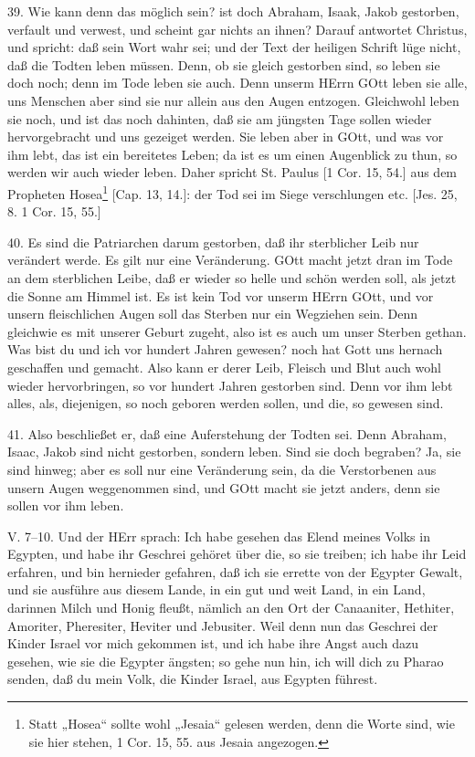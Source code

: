 39. Wie kann denn das möglich sein? ist doch Abraham, Isaak, Jakob gestorben, verfault und verwest, und scheint gar nichts an ihnen? Darauf antwortet Christus, und spricht: daß sein Wort wahr sei; und der Text der heiligen Schrift lüge nicht, daß die Todten leben müssen. Denn, ob sie gleich gestorben sind, so leben sie doch noch; denn im Tode leben sie auch. Denn unserm HErrn GOtt leben sie alle, uns Menschen aber sind sie nur allein aus den Augen entzogen. Gleichwohl leben sie noch, und ist das noch dahinten, daß sie am jüngsten Tage sollen wieder hervorgebracht und uns gezeiget werden. Sie leben aber in GOtt, und was vor ihm lebt, das ist ein bereitetes Leben; da ist es um einen Augenblick zu thun, so werden wir auch wieder leben. Daher spricht St. Paulus [1 Cor. 15, 54.] aus dem Propheten Hosea\footnote{Statt „Hosea“ sollte wohl „Jesaia“ gelesen werden, denn die Worte sind, wie sie hier stehen, 1 Cor. 15, 55. aus Jesaia angezogen.} [Cap. 13, 14.]: der Tod sei im Siege verschlungen etc. [Jes. 25, 8. 1 Cor. 15, 55.]

40. Es sind die Patriarchen darum gestorben,
daß ihr sterblicher Leib nur verändert werde. Es gilt nur eine Veränderung. GOtt macht jetzt dran im Tode an dem sterblichen Leibe, daß er wieder so helle und schön werden soll, als jetzt die Sonne am Himmel ist. Es ist kein Tod vor unserm HErrn GOtt, und vor unsern fleischlichen Augen soll das Sterben nur ein Wegziehen sein. Denn gleichwie es mit unserer Geburt zugeht, also ist es auch um unser Sterben gethan. Was bist du und ich vor hundert Jahren gewesen? noch hat Gott uns hernach geschaffen und gemacht. Also kann er derer Leib, Fleisch und Blut auch wohl wieder hervorbringen, so vor hundert Jahren gestorben sind. Denn vor ihm lebt alles, als, diejenigen, so noch geboren werden sollen, und die, so gewesen sind.

41. Also beschließet er, daß eine Auferstehung der Todten sei. Denn Abraham, Isaac, Jakob sind nicht gestorben, sondern leben. Sind sie doch begraben? Ja, sie sind hinweg; aber es soll nur eine Veränderung sein, da die Verstorbenen aus unsern Augen weggenommen sind, und GOtt macht sie jetzt anders, denn sie sollen vor ihm leben.

\begin{schriftzitat}
V. 7–10. Und der HErr sprach: Ich habe gesehen das Elend meines Volks in Egypten, und habe ihr Geschrei gehöret über die, so sie treiben; ich habe ihr Leid erfahren, und bin hernieder gefahren, daß ich sie errette von der Egypter Gewalt, und sie ausführe aus diesem Lande, in ein gut und weit Land, in ein Land, darinnen Milch und Honig fleußt, nämlich an den Ort der Canaaniter, Hethiter, Amoriter, Pheresiter, Heviter und Jebusiter. Weil denn nun das Geschrei der Kinder Israel vor mich gekommen ist, und ich habe ihre Angst auch dazu gesehen, wie sie die Egypter ängsten; so gehe nun hin, ich will dich zu Pharao senden, daß du mein Volk, die Kinder Israel, aus Egypten führest.
\end{schriftzitat}

